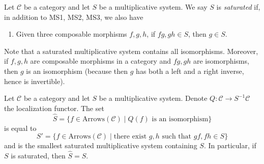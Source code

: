 \begin{definition}
\label{definition-saturated-multiplicative-system}
Let $\mathcal{C}$ be a category and let $S$ be a multiplicative system.
We say $S$ is {\it saturated} if, in addition to MS1, MS2, MS3, we
also have
\begin{enumerate}
\item[MS4] Given three composable morphisms $f, g, h$, if
$fg, gh \in S$, then $g \in S$.
\end{enumerate}
\end{definition}

\noindent
Note that a saturated multiplicative system contains all isomorphisms.
Moreover, if $f, g, h$ are composable morphisms in a category and
$fg, gh$ are isomorphisms, then $g$ is an isomorphism (because then $g$
has both a left and a right inverse, hence is invertible).

\begin{lemma}
\label{lemma-what-gets-inverted}
Let $\mathcal{C}$ be a category and let $S$ be a multiplicative system.
Denote $Q : \mathcal{C} \to S^{-1}\mathcal{C}$ the localization functor.
The set
$$
\hat S = \{f \in \text{Arrows}(\mathcal{C}) \mid
Q(f) \text{ is an isomorphism}\}
$$
is equal to
$$
S' = \{f \in \text{Arrows}(\mathcal{C}) \mid
\text{there exist }g, h\text{ such that }gf, fh \in S\}
$$
and is the smallest saturated multiplicative system containing $S$.
In particular, if $S$ is saturated, then $\hat S = S$.
\end{lemma}

